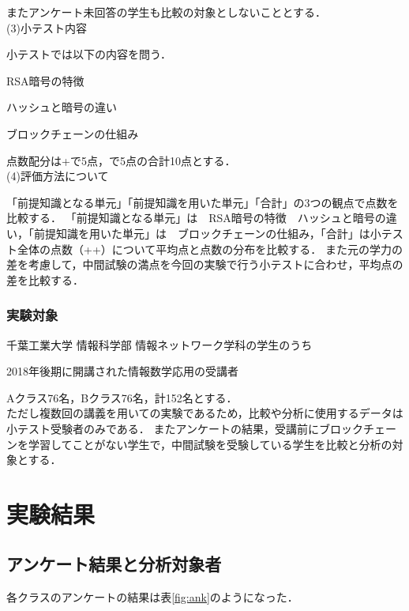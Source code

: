 \documentclass[a4j,12pt]{jsarticle}
\begin{document}
またアンケート未回答の学生も比較の対象としないこととする．
\\


(3)小テスト内容

小テストでは以下の内容を問う．

RSA暗号の特徴

ハッシュと暗号の違い

ブロックチェーンの仕組み

点数配分は+で5点，で5点の合計10点とする．\\


(4)評価方法について

「前提知識となる単元」「前提知識を用いた単元」「合計」の3つの観点で点数を比較する．
「前提知識となる単元」は　RSA暗号の特徴　ハッシュと暗号の違い，「前提知識を用いた単元」は　ブロックチェーンの仕組み，「合計」は小テスト全体の点数（++）について平均点と点数の分布を比較する．
また元の学力の差を考慮して，中間試験の満点を今回の実験で行う小テストに合わせ，平均点の差を比較する．

\subsubsection{実験対象}

千葉工業大学 情報科学部 情報ネットワーク学科の学生のうち

2018年後期に開講された情報数学応用の受講者

Aクラス76名，Bクラス76名，計152名とする．\\

ただし複数回の講義を用いての実験であるため，比較や分析に使用するデータは小テスト受験者のみである．
またアンケートの結果，受講前にブロックチェーンを学習してことがない学生で，中間試験を受験している学生を比較と分析の対象とする．





\newpage
\section{実験結果}
\subsection{アンケート結果と分析対象者}
各クラスのアンケートの結果は表\ref{fig:ank}のようになった．\\
\end{document}
